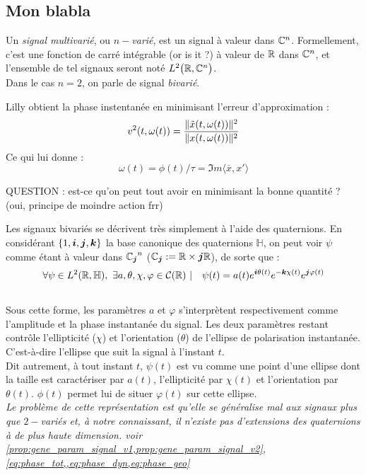 \subsection{Mon blabla}\label{subsec:blabla}


\begin{definition} \label{def:signal_multivar}
Un \emph{signal multivarié}, ou \emph{$n-$varié}, est un signal à valeur dans $\C^n$. Formellement, c'est une fonction de carré intégrable (or is it ?) à valeur de $\R$ dans $\C^n$, et l'ensemble de tel signaux seront noté $L^2\big(\R,\C^n\big)$.
\\
Dans le cas $n=2$, on parle de signal \emph{bivarié}.
\end{definition}

\begin{enonce}
	Lilly \cite[p. 602/3]{lilly_analysis_2012} obtient la phase instentanée en minimisant l'erreur d'approximation :
	\[v^2(t,\omega(t)) = \frac{\|\Tilde{x}(t,\omega(t))\|^2}{\|x(t,\omega(t))\|^2}\]
	Ce qui lui donne :
	\[\omega(t) = \phi(t)/\tau = \Im m\langle \overline{x}, x'\rangle\]
	
	QUESTION : est-ce qu'on peut tout avoir en minimisant la bonne quantité ? (oui, principe de moindre action frr)
\end{enonce}

\begin{proposition}\label{prop:quatern}
Les signaux bivariés se décrivent très simplement à l'aide des quaternions. En considérant $\{1, \bf{i},\bf{j},\bf{k}\}$ la base canonique des quaternions $\mathbb{H}$, on peut voir $\psi$ comme étant à valeur dans ${\C_{\bf{j}}}^n$ ($\C_{\bf{j}} :=\R\times \bf{j}\R$), de sorte que :
\[\forall \psi\in L^2(\R,\mathbb{H}),\ \exists a,\theta,\chi,\varphi \in\mathcal{C}(\R)\ |\quad \psi(t) = a(t)e^{\bf{i}\theta(t)}e^{-\bf{k}\chi(t)}e^{\bf{j}\varphi(t)}\]
\\
Sous cette forme, les paramètres $a$ et $\varphi$ s'interprètent respectivement comme l'amplitude et la phase instantanée du signal. Les deux paramètres restant contrôle l'ellipticité ($\chi$) et l'orientation ($\theta$) de l’ellipse de polarisation instantanée. C'est-à-dire l'ellipse que suit la signal à l'instant $t$.
\\
Dit autrement, à tout instant $t$, $\psi(t)$ est vu comme une point d'une ellipse dont la taille est caractériser par $a(t)$, l'ellipticité par $\chi(t)$ et l'orientation par $\theta(t)$. $\phi(t)$ permet lui de situer $\varphi(t)$ sur cette ellipse.
\\

\textit{Le problème de cette représentation est qu'elle se généralise mal aux signaux plus que $2-$variés et, à notre connaissant, il n'existe pas d'extensions des quaternions à de plus haute dimension. voir \cref{prop:gene_param_signal_v1,prop:gene_param_signal_v2}, \cref{eq:phase_tot,,eq:phase_dyn,eq:phase_geo}} 
\end{proposition}

